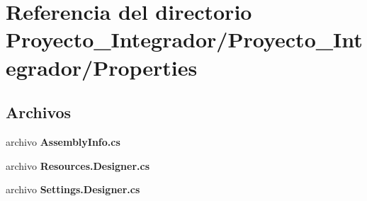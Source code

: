 \section{Referencia del directorio Proyecto\-\_\-\-Integrador/\-Proyecto\-\_\-\-Integrador/\-Properties}
\label{dir_18cbfbbdfd0ffea6b9cd586b25b9669a}
\subsection*{Archivos}
\begin{DoxyCompactItemize}
\item 
archivo {\bf Assembly\-Info.\-cs}
\item 
archivo {\bf Resources.\-Designer.\-cs}
\item 
archivo {\bf Settings.\-Designer.\-cs}
\end{DoxyCompactItemize}
